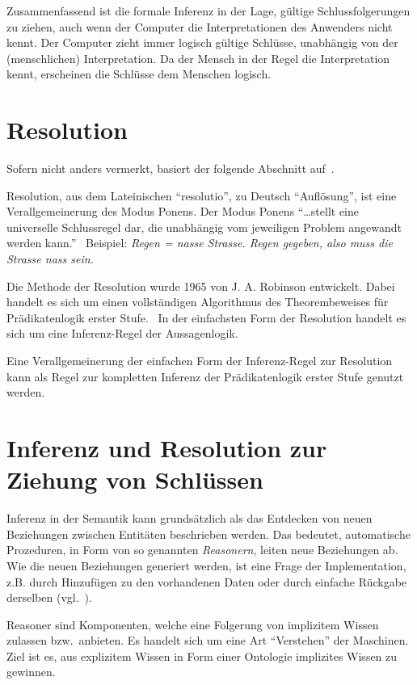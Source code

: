 Zusammenfassend ist die formale Inferenz in der Lage, gültige Schlussfolgerungen zu ziehen, auch wenn der Computer die Interpretationen des Anwenders nicht kennt. Der Computer zieht immer logisch gültige Schlüsse, unabhängig von der (menschlichen) Interpretation. Da der Mensch in der Regel die Interpretation kennt, erscheinen die Schlüsse dem Menschen logisch.

\section{Resolution}
\label{sec:resolution}
Sofern nicht anders vermerkt, basiert der folgende Abschnitt auf~\cite[S. 277 - 279]{russel}.

Resolution, aus dem Lateinischen ``resolutio'', zu Deutsch ``Auflösung'', ist eine Verallgemeinerung des Modus Ponens. Der Modus Ponens ``\ldots stellt eine universelle Schlussregel dar, die unabhängig vom jeweiligen Problem angewandt werden kann.''~\cite[S. 41]{laemmel} Beispiel: \textit{Regen = nasse Strasse. Regen gegeben, also muss die Strasse nass sein.}

Die Methode der Resolution wurde 1965 von J. A. Robinson entwickelt. Dabei handelt es sich um einen vollständigen Algorithmus des Theorembeweises für Prädikatenlogik erster Stufe.~\cite[S. 18]{russel} In der einfachsten Form der Resolution handelt es sich um eine Inferenz-Regel der Aussagenlogik.

Eine Verallgemeinerung der einfachen Form der Inferenz-Regel zur Resolution kann als Regel zur kompletten Inferenz der Prädikatenlogik erster Stufe genutzt werden.

\section{Inferenz und Resolution zur Ziehung von Schlüssen}
\label{sec:inferenz_praktisch}
Inferenz in der Semantik kann grundsätzlich als das Entdecken von neuen Beziehungen zwischen Entitäten beschrieben werden. Das bedeutet, automatische Prozeduren, in Form von so genannten \textit{Reasonern}, leiten neue Beziehungen ab. Wie  die neuen Beziehungen generiert werden, ist eine Frage der Implementation, z.B. durch Hinzufügen zu den vorhandenen Daten oder durch einfache Rückgabe derselben (vgl.~\cite[Abschn. 1]{w3inference}).

Reasoner sind Komponenten, welche eine Folgerung von implizitem Wissen zulassen bzw.\ anbieten. Es handelt sich um eine Art ``Verstehen'' der Maschinen. Ziel ist es, aus explizitem Wissen in Form einer Ontologie implizites Wissen zu gewinnen.

